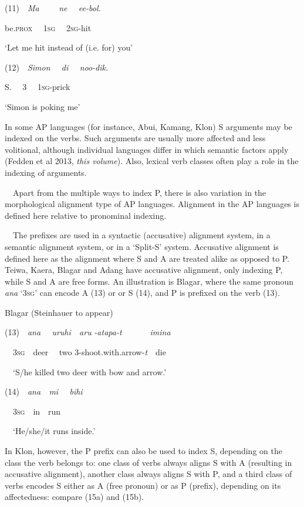 (11)\ \ \textit{Ma \ \ \ \ ne \ \ ee-bol.}

be.\textsc{prox \ \ 1sg \ \ 2sg}{}-hit

{\textquoteleft}Let me hit instead of (i.e. for) you{\textquoteright}

(12)\ \ \textit{Simon \ \ di \ \ noo-dik.}

S. \ \ 3 \ \ \textsc{1sg}{}-prick

{\textquoteleft}Simon is poking me{\textquoteright}

In some AP languages (for instance, Abui, Kamang, Klon) S arguments may be indexed on the verbs. Such arguments are usually more affected and less volitional, although individual languages differ in which semantic factors apply (Fedden et al 2013, \textit{this volume}). Also, lexical verb classes often play a role in the indexing of arguments. 

\ \ Apart from the multiple ways to index P, there is also variation in the morphological alignment type of AP languages. Alignment in the AP languages is defined here relative to pronominal indexing. 

\ \ The prefixes are used in a syntactic (accusative) alignment system, in a semantic alignment system, or in a {\textquoteleft}Split-S{\textquoteright} system. Accusative alignment is defined here as the alignment where S and A are treated alike as opposed to P. Teiwa, Kaera, Blagar and Adang have accusative alignment, only indexing P, while S and A are free forms. An illustration is Blagar, where the same pronoun \textit{{\textglotstop}}\textit{ana }{\textquoteleft}3\textsc{sg}{\textquoteright} can encode A (13) or or S (14), and P is prefixed on the verb (13).

Blagar (Steinhauer to appear) 

(13)\ \ \textit{{\textglotstop}}\textit{ana \ \ uruhi{\ng}\ \ aru }\textit{{\textglotstop}}\textit{{}-atapa-t \ \ \ \ \ \ imina}

\ \ 3\textsc{sg}\ \ deer \ \ two 3-shoot.with.arrow-\textit{t}\ \ die

\ \ {\textquoteleft}S/he killed two deer with bow and arrow.{\textquoteright}

(14)\ \  \textit{{\textglotstop}}\textit{ana\ \ mi \ \ bihi}

\ \ 3\textsc{sg}\ \ in\ \ run

\ \ {\textquoteleft}He/she/it runs inside.{\textquoteright}

In Klon, however, the P prefix can also be used to index S, depending on the class the verb belongs to: one class of verbs always aligns S with A (resulting in accusative alignment), another class always aligns S with P, and a third class of verbs encodes S either as A (free pronoun) or as P (prefix), depending on its affectedness: compare (15a) and (15b).


